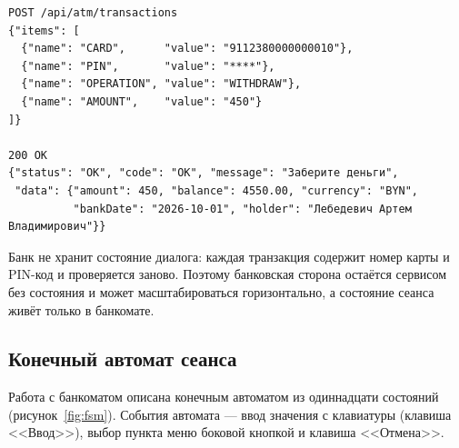 \documentclass[14pt,a4paper]{extarticle}
\begin{document}
\begin{lstlisting}[style=json, caption={Транзакция снятия наличных и ответ банка}, label={lst:exchange}]
POST /api/atm/transactions
{"items": [
  {"name": "CARD",      "value": "9112380000000010"},
  {"name": "PIN",       "value": "****"},
  {"name": "OPERATION", "value": "WITHDRAW"},
  {"name": "AMOUNT",    "value": "450"}
]}

200 OK
{"status": "OK", "code": "OK", "message": "Заберите деньги",
 "data": {"amount": 450, "balance": 4550.00, "currency": "BYN",
          "bankDate": "2026-10-01", "holder": "Лебедевич Артем Владимирович"}}
\end{lstlisting}

Банк не хранит состояние диалога: каждая транзакция содержит номер карты и PIN-код и
проверяется заново. Поэтому банковская сторона остаётся сервисом без состояния и может
масштабироваться горизонтально, а состояние сеанса живёт только в банкомате.

\subsection{Конечный автомат сеанса}

Работа с банкоматом описана конечным автоматом из одиннадцати состояний
(рисунок~\ref{fig:fsm}). События автомата --- ввод значения с клавиатуры (клавиша <<Ввод>>),
выбор пункта меню боковой кнопкой и клавиша <<Отмена>>.
\end{document}
